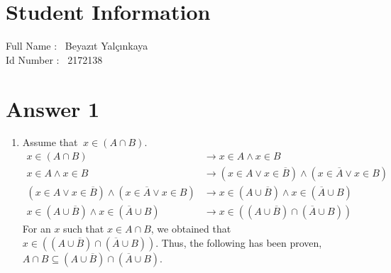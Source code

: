 \documentclass[12pt]{article}
\begin{document}
\section*{Student Information } 
Full Name : \ Beyazıt Yalçınkaya \ \\
Id Number : \ 2172138 \ \\

\section*{Answer 1}

\renewcommand{\theenumi}{\alph{enumi}}
\begin{enumerate}
    \item Assume that $\ x \in (A \cap B)$.
        \begin{equation*}
        \begin{split}
        x \in (A \cap B) & \rightarrow x \in A \land x \in B 
        \\
        x \in A \land x \in B & \rightarrow (x \in A \lor x\in \overline{B}) \land (x \in \overline{A} \lor x \in B) 
        \\
        (x \in A \lor x\in \overline{B}) \land (x \in \overline{A} \lor x \in B) & \rightarrow x \in (A \cup \overline{B}) \land x \in (\overline{A} \cup B) 
        \\
        x \in (A \cup \overline{B}) \land x \in (\overline{A} \cup B) & \rightarrow x \in ((A \cup \overline{B}) \cap (\overline{A} \cup B))
        \end{split}
        \end{equation*}
        For an $x$ such that $x \in A \cap B$, we obtained that $x \in ((A \cup \overline{B}) \cap (\overline{A} \cup B))$. Thus, the following has been proven, $A \cap B \subseteq (A \cup \overline{B}) \cap (\overline{A} \cup B)$.
        

\end{enumerate}
\end{document}
